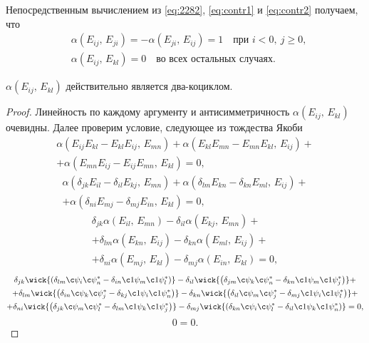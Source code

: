 \documentclass[a4paper,14pt]{extarticle}
\numberwithin{equation}{section}
\begin{document}
Непосредственным вычислением из \eqref{eq:2282}, \eqref{eq:contr1} и \eqref{eq:contr2} получаем, что 
\begin{equation}
	\begin{aligned}
		&\alpha\left( E_{ij},\,E_{ji} \right) =-\alpha
	\left( E_{ji},\,E_{ij} \right) =1\quad
	\text{при } i<  0,\ j\ge 0,\\
	&\alpha\left( E_{ij},\,E_{kl} \right) =0
		\quad \text{во всех остальных случаях.}
	\end{aligned}
	\label{alph}
\end{equation}
\begin{stm*}
$\alpha\left( E_{ij},\,E_{kl} \right) $ действительно является два-коциклом.
\end{stm*}

\begin{proof}
Линейность по каждому
аргументу и антисимметричность $\alpha\left( E_{ij},\,E_{kl} \right) $ очевидны.
Далее проверим условие, следующее из тождества Якоби
\begin{multline}
	\alpha\left( E_{ij}E_{kl}-E_{kl}E_{ij},\,E_{mn}  \right) +
	\alpha\left( E_{kl}E_{mn}-E_{mn}E_{kl},\,E_{ij} \right) +\\+
	\alpha\left( E_{mn}E_{ij}-E_{ij}E_{mn},\,E_{kl} \right) =0
,\end{multline} 
\begin{multline}
	\alpha\left( \delta_{jk}E_{il}-\delta_{il}E_{kj},\,E_{mn}  \right) +	\alpha\left( \delta_{lm}E_{kn}-\delta_{kn}E_{ml},\,E_{ij} \right) +\\+
	\alpha\left( \delta_{ni}E_{mj}-\delta_{mj}E_{in},\,E_{kl} \right) =0
,\end{multline}
\begin{multline}
	\delta_{jk}\alpha \left(E_{il},\,E_{mn}\right)-\delta_{il}\alpha\left(E_{kj},\,E_{mn}\right)  +\\+
	\delta_{lm}\alpha \left(E_{kn},\,E_{ij}\right)-\delta_{kn}\alpha\left(E_{ml},\,E_{ij}\right) +\\+
	\delta_{ni}\alpha \left(E_{mj},\,E_{kl}\right)-\delta_{mj}\alpha\left(E_{in},\,E_{kl}\right) =0
,\end{multline}
\begin{multline}
	\delta_{jk}\wick{\left( \delta_{lm} \c \psi_i \c\psi_n^*-
	\delta_{in} \c1 \psi_m \c1 \psi_l^* \right)} -\delta_{il}\wick{\left( \delta_{jm} \c \psi_k \c\psi_n^*-
	\delta_{kn} \c1 \psi_m \c1 \psi_j^* \right)} +\\+	\delta_{lm}\wick{\left( \delta_{in} \c \psi_k \c\psi_j^*-
	\delta_{kj} \c1 \psi_i \c1 \psi_n^* \right)}-\delta_{kn}\wick{\left( \delta_{il} \c \psi_m \c\psi_j^*-
	\delta_{mj} \c1 \psi_i \c1 \psi_l^* \right)}+\\+	\delta_{ni}\wick{\left( \delta_{jk} \c \psi_m \c\psi_l^*-
	\delta_{lm} \c1 \psi_k \c1 \psi_j^* \right)}-\delta_{mj}\wick{\left( \delta_{kn} \c \psi_i \c\psi_l^*-
	\delta_{il} \c1 \psi_k \c1 \psi_n^* \right)}=0
,\end{multline}
\begin{equation}
0=0
.\end{equation} 
\end{proof}
\end{document}
